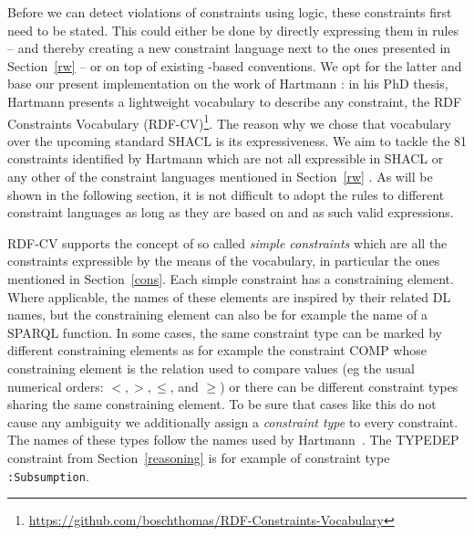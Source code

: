 Before we can detect violations of constraints using \nthree logic,
these constraints first need to be stated.
This could either be done by directly expressing them in 
rules -- and thereby creating
a new constraint language next to the ones presented in Section~\ref{rw} -- or on top of existing \rdf-based conventions. 
We opt for the latter and base our present implementation on the work of Hartmann \cite[p.167 ff]{hartmann2016}:
in his PhD thesis, Hartmann presents a lightweight vocabulary to describe any constraint, 
the RDF Constraints Vocabulary (RDF-CV)\footnote{\url{https://github.com/boschthomas/RDF-Constraints-Vocabulary}}. The reason why we chose that vocabulary over 
the upcoming standard
SHACL is its expressiveness. We aim to tackle the 81 constraints identified by Hartmann which are not all expressible in SHACL 
or any other of the constraint languages
mentioned in Section~\ref{rw} \cite[p.52, appendix]{hartmann2016}. As will be shown in the following section, it is not difficult to adopt the rules to different 
constraint languages as long as they are based on \rdf and as such valid \nthree expressions.

RDF-CV supports the concept of so called \emph{simple constraints} which are all the constraints expressible by the means of the vocabulary, in particular 
the ones mentioned in Section~\ref{cons}. Each simple constraint has a constraining element. Where applicable, the names of these elements are inspired by their related 
DL names, but the constraining element can also be for example the name of a SPARQL function. In some cases, the same constraint type 
can be marked by different constraining elements as for example the constraint COMP whose constraining element is the relation 
used to compare values 
(eg the usual numerical orders: $<,>,\leq$, and $\geq$) or there can be different constraint types sharing the same constraining element.
To be sure that cases like this do not cause any ambiguity we additionally assign a \emph{constraint type} to every constraint. 
The names of these types follow the names used by Hartmann~\cite[appendix]{hartmann2016}. 
The TYPEDEP constraint from Section~\ref{reasoning} is for example of constraint type \texttt{:Subsumption}.

